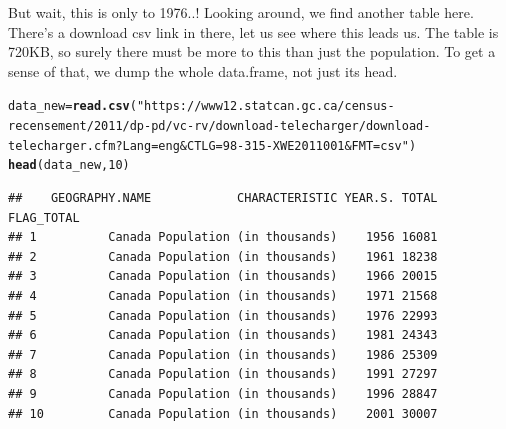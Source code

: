 \documentclass[aspectratio=169]{beamer}\usepackage[]{graphicx}\usepackage[]{xcolor}
\makeatletter
\newcommand{\hlnum}[1]{\textcolor[rgb]{0.686,0.059,0.569}{#1}}%
\newcommand{\hlstr}[1]{\textcolor[rgb]{0.192,0.494,0.8}{#1}}%
\newcommand{\hlstd}[1]{\textcolor[rgb]{0.345,0.345,0.345}{#1}}%
\newcommand{\hlkwb}[1]{\textcolor[rgb]{0.69,0.353,0.396}{#1}}%
\newcommand{\hlkwd}[1]{\textcolor[rgb]{0.737,0.353,0.396}{\textbf{#1}}}%
\newenvironment{kframe}{%
 \def\at@end@of@kframe{}%
 \ifinner\ifhmode%
  \def\at@end@of@kframe{\end{minipage}}%
  \begin{minipage}{\columnwidth}%
 \fi\fi%
 \def\FrameCommand##1{\hskip\@totalleftmargin \hskip-\fboxsep
 \colorbox{shadecolor}{##1}\hskip-\fboxsep
     \hskip-\linewidth \hskip-\@totalleftmargin \hskip\columnwidth}%
 \MakeFramed {\advance\hsize-\width
   \@totalleftmargin\z@ \linewidth\hsize
   \@setminipage}}%
 {\par\unskip\endMakeFramed%
 \at@end@of@kframe}
\newenvironment{knitrout}{}{} %
\makeatother
\begin{document}
\begin{frame}[fragile]
But wait, this is only to 1976..! Looking around, we find another table here. There's a download csv link in there, let us see where this leads us. The table is 720KB, so surely there must be more to this than just the population. To get a sense of that, we dump the whole data.frame, not just its head.

\begin{knitrout}
\color{fgcolor}\begin{kframe}
\begin{alltt}
\hlstd{data_new} \hlkwb{=} \hlkwd{read.csv}\hlstd{(}\hlstr{"https://www12.statcan.gc.ca/census-recensement/2011/dp-pd/vc-rv/download-telecharger/download-telecharger.cfm?Lang=eng&CTLG=98-315-XWE2011001&FMT=csv"}\hlstd{)}
\hlkwd{head}\hlstd{(data_new,} \hlnum{10}\hlstd{)}
\end{alltt}
\begin{verbatim}
##    GEOGRAPHY.NAME            CHARACTERISTIC YEAR.S. TOTAL FLAG_TOTAL
## 1          Canada Population (in thousands)    1956 16081           
## 2          Canada Population (in thousands)    1961 18238           
## 3          Canada Population (in thousands)    1966 20015           
## 4          Canada Population (in thousands)    1971 21568           
## 5          Canada Population (in thousands)    1976 22993           
## 6          Canada Population (in thousands)    1981 24343           
## 7          Canada Population (in thousands)    1986 25309           
## 8          Canada Population (in thousands)    1991 27297           
## 9          Canada Population (in thousands)    1996 28847           
## 10         Canada Population (in thousands)    2001 30007
\end{verbatim}
\end{kframe}
\end{knitrout}
\end{frame}
\end{document}
